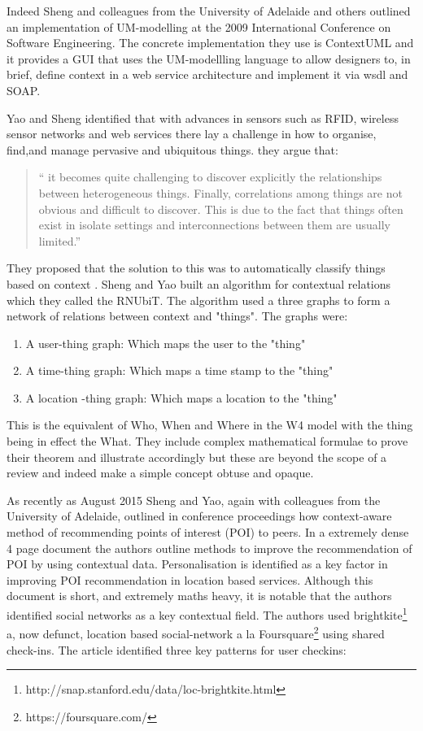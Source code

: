 \documentclass[]{report}
\begin{document}
Indeed Sheng and colleagues from the University of Adelaide and others outlined an implementation of UM-modelling at the 2009 International Conference on Software Engineering\cite{7}. The concrete implementation they use is ContextUML and it provides a GUI that uses the UM-modellling language to allow designers to, in brief, define context in a web service architecture and implement it via wsdl and SOAP.
 
Yao and Sheng\cite{8} identified that with advances in sensors such as RFID, wireless sensor networks and web services there lay a challenge in how to organise, find,and manage pervasive and ubiquitous things. they argue that:
 \begin{quote}
 `` it
 becomes quite challenging to discover explicitly the relationships
 between heterogeneous things. Finally, correlations among things
 are not obvious and difficult to discover. This is due to the fact that
 things often exist in isolate settings and interconnections between
 them are usually limited.''
\end{quote}
 They proposed that the solution to this was to automatically classify things based on context . Sheng and Yao built an algorithm for contextual relations which they called the RNUbiT. The algorithm used a three graphs to form a network of relations between context and "things". The graphs were:
 \begin{enumerate}
 	\item A user-thing graph: Which maps the user to the "thing"
 	\item A time-thing graph: Which maps a time stamp to the "thing"
 	\item A location -thing graph: Which maps a location to the "thing"
 \end{enumerate}
 This is the equivalent of Who, When and Where in the W4 model\cite{2} with the thing being in effect the What. They include complex mathematical formulae to prove their theorem and illustrate accordingly but these are beyond the scope of a review and indeed make a simple concept obtuse and opaque.\par
 As recently as August 2015 Sheng and Yao, again with colleagues from the University of Adelaide, outlined in conference proceedings how context-aware method of recommending points of interest (POI) to peers\cite{9}. In a extremely dense 4 page document the authors outline methods to improve the recommendation of POI by using contextual data. Personalisation is identified as a key factor in improving POI recommendation in location based services. Although this document is short, and extremely maths heavy, it is notable that the authors identified social networks as a key contextual field. The authors used brightkite\footnote{http://snap.stanford.edu/data/loc-brightkite.html}  a, now defunct, location based social-network a la Foursquare\footnote{https://foursquare.com/} using shared check-ins. The article identified three key patterns for user checkins:
\end{document}
